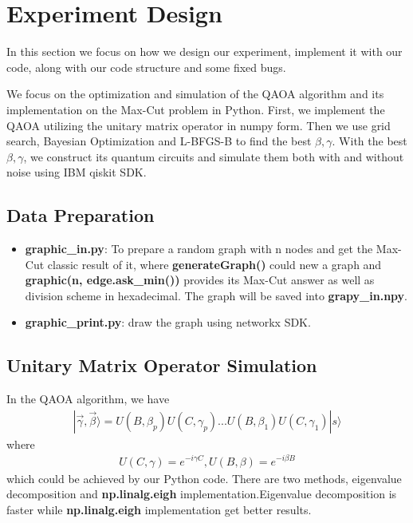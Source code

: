 \section{Experiment Design}
In this section we focus on how we design our experiment, implement it with our code, along with our code structure and some fixed bugs.

We focus on the optimization and simulation of the QAOA algorithm and its implementation on the Max-Cut problem in Python. First, we implement the QAOA utilizing the unitary matrix operator in numpy form. Then we use grid search, Bayesian Optimization and L-BFGS-B to find the best $\beta,\gamma$. With the best  $\beta,\gamma$, we construct its quantum circuits and simulate them both with and without noise using IBM qiskit SDK\cite{Qiskit}. 

\subsection{Data Preparation}
\begin{itemize}
    \item \textbf{graphic\_in.py}: To prepare a random graph with n nodes and get the Max-Cut classic result of it, where \textbf{generateGraph()}  could new a graph and \textbf{graphic(n, edge.ask\_min())} provides its Max-Cut answer as well as division scheme in hexadecimal. The graph will be saved into \textbf{grapy\_in.npy}. 
    \item \textbf{graphic\_print.py}: draw the graph using networkx SDK.
\end{itemize}

\subsection{Unitary Matrix Operator Simulation}
In the QAOA algorithm, we have 
\begin{align*}
    |\vec{\gamma}, \vec{\beta}\rangle=U(B,\beta_p)U(C,\gamma_p)...U(B,\beta_1)U(C,\gamma_1)|s\rangle 
\end{align*}
where 
\begin{align*}
    U(C, \gamma)=e^{-i\gamma C},U(B, \beta)=e^{-i\beta B}
\end{align*}
which could be achieved by our Python code. There are two methods, eigenvalue decomposition and \textbf{np.linalg.eigh} implementation.Eigenvalue decomposition is faster while \textbf{np.linalg.eigh} implementation get better results.


